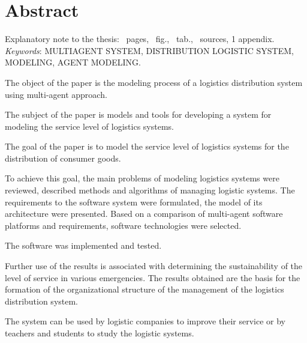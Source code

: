 \section*{Abstract}
Explanatory note to the thesis: \pageref{LastPage}~pages, \totalfigures~fig., \totaltables~tab., ~sources, 1 appendix. \bigbreak 
\textit{Keywords}: \MakeUppercase{multiagent system, distribution logistic system, modeling, agent modeling}. \bigbreak 

The object of the paper is the modeling process of a logistics distribution system using multi-agent approach.

The subject of the paper is models and tools for developing a system for modeling the service level of logistics systems.

The goal of the paper is to model the service level of logistics systems for the distribution of consumer goods.

To achieve this goal, the main problems of modeling logistics systems were reviewed, described methods and algorithms of managing logistic systems. The requirements to the software system were formulated, the model of its architecture were presented. Based on a comparison of multi-agent software platforms and requirements, software technologies were selected.

The software was implemented and tested.

Further use of the results is associated with determining the sustainability of the level of service in various emergencies. The results obtained are the basis for the formation of the organizational structure of the management of the logistics distribution system.

The system can be used by logistic companies to improve their service or by teachers and students to study the logistic systems.

